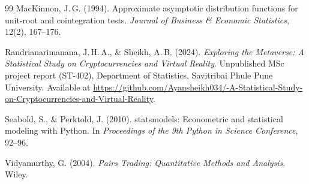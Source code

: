 \documentclass[10pt,a4paper,twocolumn]{article}
\begin{document}
\begin{thebibliography}{99}
		 MacKinnon, J.\,G. (1994). Approximate asymptotic distribution functions for unit-root and cointegration tests. \emph{Journal of Business \& Economic Statistics}, 12(2), 167--176.
		
		 Randrianarimanana, J.\,H.\,A., \& Sheikh, A.\,B. (2024). \emph{Exploring the Metaverse: A Statistical Study on Cryptocurrencies and Virtual Reality}. Unpublished MSc project report (ST-402), Department of Statistics, Savitribai Phule Pune University. Available at \url{https://github.com/Ayansheikh034/-A-Statistical-Study-on-Cryptocurrencies-and-Virtual-Reality}.
		
		 Seabold, S., \& Perktold, J. (2010). statsmodels: Econometric and statistical modeling with Python. In \emph{Proceedings of the 9th Python in Science Conference}, 92--96.
		
		 Vidyamurthy, G. (2004). \emph{Pairs Trading: Quantitative Methods and Analysis}. Wiley.
		
	\end{thebibliography}
	\endgroup
	
\end{document}
